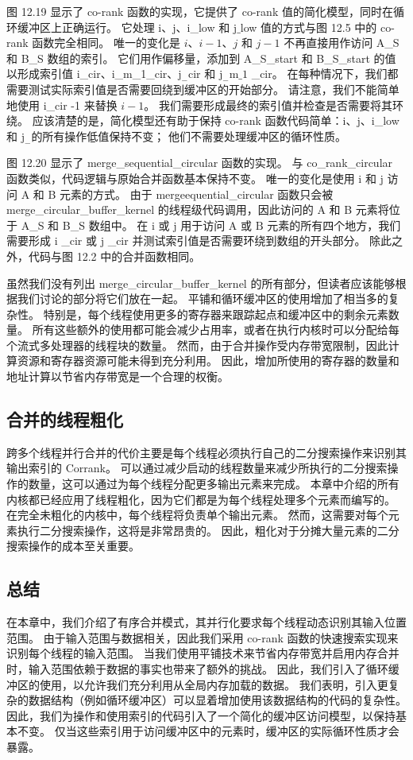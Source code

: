 图 12.19 显示了 co-rank 函数的实现，它提供了 co-rank 值的简化模型，同时在循环缓冲区上正确运行。 它处理 $\mathrm{i}、\mathrm{j}$、i\_low 和 $\mathrm{j} \_$low 值的方式与图 12.5 中的 co-rank 函数完全相同。 唯一的变化是 $i、i-1、j$ 和 $j-1$ 不再直接用作访问 A\_S 和 B\_S 数组的索引。 它们用作偏移量，添加到 A\_S\_start 和 B\_S\_start 的值以形成索引值 i\_cir、i\_m\_1\_cir、$\mathrm{j}_{ -}$cir 和 $\mathrm{j}_{-} \mathrm{m} \_1$ \_cir。 在每种情况下，我们都需要测试实际索引值是否需要回绕到缓冲区的开始部分。 请注意，我们不能简单地使用 i\_cir -1 来替换 $i-1$。 我们需要形成最终的索引值并检查是否需要将其环绕。 应该清楚的是，简化模型还有助于保持 co-rank 函数代码简单：$\mathrm{i}、\mathrm{j}$、i\_low 和 $\mathrm{j}_{-}$的所有操作低值保持不变； 他们不需要处理缓冲区的循环性质。

图 12.20 显示了 merge\_sequential\_circular 函数的实现。 与 co\_rank\_circular 函数类似，代码逻辑与原始合并函数基本保持不变。 唯一的变化是使用 $\mathrm{i}$ 和 $\mathrm{j}$ 访问 A 和 B 元素的方式。 由于 mergeequential\_circular 函数只会被 merge\_circular\_buffer\_kernel 的线程级代码调用，因此访问的 A 和 B 元素将位于 A\_S 和 B\_S 数组中。 在 $\mathrm{i}$ 或 $\mathrm{j}$ 用于访问 A 或 $\mathrm{B}$ 元素的所有四个地方，我们需要形成 $\mathrm{i}$ \_cir 或 $\mathrm{j}$ \_cir 并测试索引值是否需要环绕到数组的开头部分。 除此之外，代码与图 12.2 中的合并函数相同。

虽然我们没有列出 merge\_circular\_buffer\_kernel 的所有部分，但读者应该能够根据我们讨论的部分将它们放在一起。 平铺和循环缓冲区的使用增加了相当多的复杂性。 特别是，每个线程使用更多的寄存器来跟踪起点和缓冲区中的剩余元素数量。 所有这些额外的使用都可能会减少占用率，或者在执行内核时可以分配给每个流式多处理器的线程块的数量。 然而，由于合并操作受内存带宽限制，因此计算资源和寄存器资源可能未得到充分利用。 因此，增加所使用的寄存器的数量和地址计算以节省内存带宽是一个合理的权衡。

\subsection{合并的线程粗化}
跨多个线程并行合并的代价主要是每个线程必须执行自己的二分搜索操作来识别其输出索引的 Corrank。 可以通过减少启动的线程数量来减少所执行的二分搜索操作的数量，这可以通过为每个线程分配更多输出元素来完成。 本章中介绍的所有内核都已经应用了线程粗化，因为它们都是为每个线程处理多个元素而编写的。 在完全未粗化的内核中，每个线程将负责单个输出元素。 然而，这需要对每个元素执行二分搜索操作，这将是非常昂贵的。 因此，粗化对于分摊大量元素的二分搜索操作的成本至关重要。

\subsection{总结}
在本章中，我们介绍了有序合并模式，其并行化要求每个线程动态识别其输入位置范围。 由于输入范围与数据相关，因此我们采用 co-rank 函数的快速搜索实现来识别每个线程的输入范围。 当我们使用平铺技术来节省内存带宽并启用内存合并时，输入范围依赖于数据的事实也带来了额外的挑战。 因此，我们引入了循环缓冲区的使用，以允许我们充分利用从全局内存加载的数据。 我们表明，引入更复杂的数据结构（例如循环缓冲区）可以显着增加使用该数据结构的代码的复杂性。 因此，我们为操作和使用索引的代码引入了一个简化的缓冲区访问模型，以保持基本不变。 仅当这些索引用于访问缓冲区中的元素时，缓冲区的实际循环性质才会暴露。